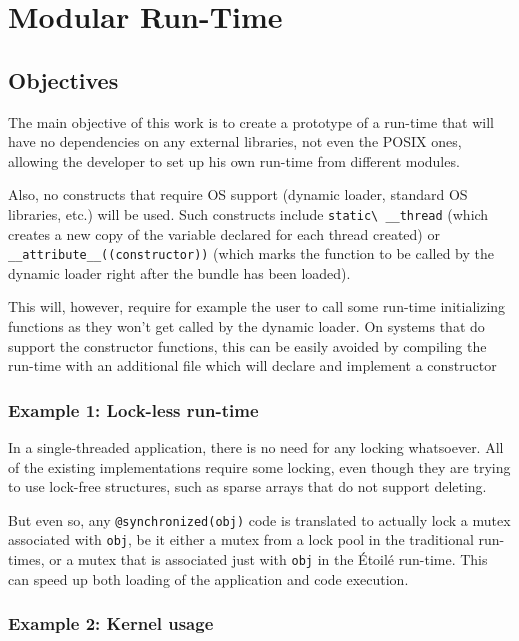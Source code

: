 \chapter{Modular Run-Time}
\section{Objectives}

The main objective of this work is to create a prototype of a run-time that will have no dependencies on any external libraries, not even the POSIX ones, allowing the developer to set up his own run-time from different modules.

Also, no constructs that require OS support (dynamic loader, standard OS libraries, etc.) will be used. Such constructs include \verb=static\ __thread= (which creates a new copy of the variable declared for each thread created) or \newline{} \verb=__attribute__((constructor))= (which marks the function to be called by the dynamic loader right after the bundle has been loaded).

This will, however, require for example the user to call some run-time initializing functions as they won't get called by the dynamic loader. On systems that do support the constructor functions, this can be easily avoided by compiling the run-time with an additional file which will declare and implement a constructor 

\subsection{Example 1: Lock-less run-time}
In a single-threaded application, there is no need for any locking whatsoever. All of the existing implementations require some locking, even though they are trying to use lock-free structures, such as sparse arrays that do not support deleting.

But even so, any \verb=@synchronized(obj)= code is translated to actually lock a mutex associated with \verb=obj=, be it either a mutex from a lock pool in the traditional run-times, or a mutex that is associated just with \verb=obj= in the \'Etoil\'e run-time. This can speed up both loading of the application and code execution.

\subsection{Example 2: Kernel usage}

